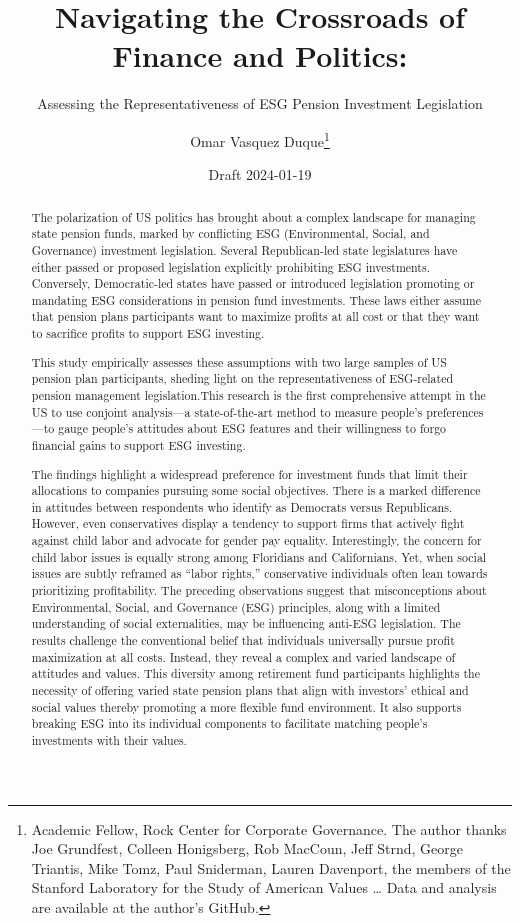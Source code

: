 \documentclass[
  12pt,
]{article}
\title{Navigating the Crossroads of Finance and Politics:}
\subtitle{Assessing the Representativeness of ESG Pension Investment Legislation}
\author{Omar Vasquez Duque\footnote{Academic Fellow, Rock Center for Corporate Governance. The author thanks Joe Grundfest, Colleen Honigsberg, Rob MacCoun, Jeff Strnd, George Triantis, Mike Tomz, Paul Sniderman, Lauren Davenport, the members of the Stanford Laboratory for the Study of American Values \ldots{} Data and analysis are available at the author's GitHub.}}
\date{Draft 2024-01-19}
\begin{document}
\maketitle
\begin{abstract}
\fontsize{10pt}{11.5pt}\selectfont

The polarization of US politics has brought about a complex landscape for managing state pension funds, marked by conflicting ESG (Environmental, Social, and Governance) investment legislation. Several Republican-led state legislatures have either passed or proposed legislation explicitly prohibiting ESG investments. Conversely, Democratic-led states have passed or introduced legislation promoting or mandating ESG considerations in pension fund investments. These laws either assume that pension plans participants want to maximize profits at all cost or that they want to sacrifice profits to support ESG investing.

This study empirically assesses these assumptions with two large samples of US pension plan participants, sheding light on the representativeness of ESG-related pension management legislation.This research is the first comprehensive attempt in the US to use conjoint analysis---a state-of-the-art method to measure people's preferences---to gauge people's attitudes about ESG features and their willingness to forgo financial gains to support ESG investing.

The findings highlight a widespread preference for investment funds that limit their allocations to companies pursuing some social objectives. There is a marked difference in attitudes between respondents who identify as Democrats versus Republicans. However, even conservatives display a tendency to support firms that actively fight against child labor and advocate for gender pay equality. Interestingly, the concern for child labor issues is equally strong among Floridians and Californians. Yet, when social issues are subtly reframed as ``labor rights,'' conservative individuals often lean towards prioritizing profitability. The preceding observations suggest that misconceptions about Environmental, Social, and Governance (ESG) principles, along with a limited understanding of social externalities, may be influencing anti-ESG legislation. The results challenge the conventional belief that individuals universally pursue profit maximization at all costs. Instead, they reveal a complex and varied landscape of attitudes and values. This diversity among retirement fund participants highlights the necessity of offering varied state pension plans that align with investors' ethical and social values thereby promoting a more flexible fund environment. It also supports breaking ESG into its individual components to facilitate matching people's investments with their values.
\end{abstract}
\end{document}
